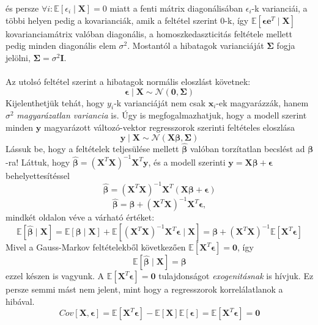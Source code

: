 \documentclass[14p]{report}
\def\pmb{\boldsymbol}
\def\ebeta{\hat{\pmb{\beta}}}
\def\e{\epsilon}
\newcounter{x}
\newcounter{y}
\newcounter{z}
\begin{document}
	és persze $\forall i : \mathbb{E}[\e_i \mid \pmb{X}] = 0$ miatt a fenti mátrix diagonálisában $\e_i$-k varianciái, a többi helyen pedig a kovarianciák, amik a feltétel szerint $0$-k, így $\mathbb{E}[\pmb{\e}\pmb{e}^T \mid \pmb{X}]$ kovarianciamátrix valóban diagonális, a homoszkedaszticitás feltétele mellett pedig minden diagonális elem $\sigma^2$. Mostantól a hibatagok varianciáját $\pmb{\Sigma}$ fogja jelölni, $\pmb{\Sigma} = \sigma^2\pmb{I}$.
	\\
	\\
	Az utolsó feltétel szerint a hibatagok normális eloszlást követnek:
	\[
	\pmb{\e} \mid \pmb{X} \sim \mathcal{N}(\pmb{0}, \pmb{\Sigma})
	\]
	Kijelenthetjük tehát, hogy $y_i$-k varianciáját nem csak $\pmb{x}_i$-ek magyarázzák, hanem $\sigma^2$ \emph{magyarázatlan variancia} is. Úgy is megfogalmazhatjuk, hogy a modell szerint minden $\pmb{y}$ magyarázott változó-vektor regresszorok szerinti feltételes eloszlása
	\[
	\pmb{y} \mid \pmb{X} \sim \mathcal{N}(\pmb{X}\pmb{\beta}, \pmb{\Sigma})
	\]
	Lássuk be, hogy a feltételek teljesülése mellett $\ebeta$ valóban torzítatlan becslést ad $\pmb{\beta}$-ra! Láttuk, hogy $\ebeta = (\pmb{X}^T\pmb{X})^{-1}\pmb{X}^T\pmb{y}$, és a modell szerinti $\pmb{y} = \pmb{X}\pmb{\beta} + \pmb{\e}$ behelyettesítéssel
	\[
	\ebeta = (\pmb{X}^T\pmb{X})^{-1}\pmb{X}^T(\pmb{X}\pmb{\beta} + \pmb{\e})
	\]
	\[
	\ebeta = \pmb{\beta} + (\pmb{X}^T\pmb{X})^{-1}\pmb{X}^T\pmb{\e},
	\]
	mindkét oldalon véve a várható értéket:
	\[
	\mathbb{E}[\ebeta \mid \pmb{X}] = \mathbb{E}[\pmb{\beta} \mid \pmb{X}] + \mathbb{E}[(\pmb{X}^T\pmb{X})^{-1}\pmb{X}^T\pmb{\e} \mid \pmb{X}] = \pmb{\beta} + (\pmb{X}^T\pmb{X})^{-1}\mathbb{E}[\pmb{X}^T\pmb{\e}]
	\]
	Mivel a Gauss-Markov feltételekből következően $\mathbb{E}[\pmb{X}^T\pmb{\e}] = \pmb{0}$, így
	\[
	\mathbb{E}[\ebeta \mid \pmb{X}] = \pmb{\beta}
	\]
	ezzel készen is vagyunk. A $\mathbb{E}[\pmb{X}^T\pmb{\e}] = \pmb{0}$ tulajdonságot \emph{exogenitásnak} is hívjuk. Ez persze semmi mást nem jelent, mint hogy a regresszorok korrelálatlanok a hibával.
	\[
		Cov[\pmb{X}, \pmb{\e}] = \mathbb{E}[\pmb{X}^T\pmb{\e}] - \mathbb{E}[\pmb{X}]\mathbb{E}[\pmb{\e}] = \mathbb{E}[\pmb{X}^T\pmb{\e}] = \pmb{0}
	\]
	
\end{document}
